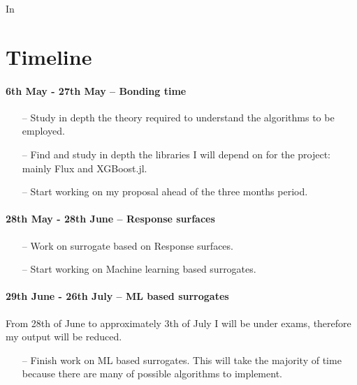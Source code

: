 \documentclass[11pt,a4paper,oneside,titlepage,openright]{book}
\begin{document}
In 



   
\chapter*{Timeline}

\subsubsection*{6th May - 27th May -- Bonding time}

\begin{itemize}
\item[--] Study in depth the theory required to understand the algorithms to be employed.
\item[--] Find and study in depth the libraries I will depend on for the project: mainly Flux and XGBoost.jl.
\item[--] Start working on my proposal ahead of the three months period. 
\end{itemize}

\subsubsection*{28th May - 28th June -- Response surfaces}

\begin{itemize}
\item[--] Work on surrogate based on Response surfaces. 
\item[--] Start working on Machine learning based surrogates.
\end{itemize}

\subsubsection*{29th June - 26th July -- ML based surrogates}

From 28th of June to approximately 3th of July I will be under exams, therefore my output will be reduced. \\
\begin{itemize}
\item[--] Finish work on ML based surrogates. This will take the majority of time because there are many of possible algorithms to implement.
\end{itemize}
\end{document}
